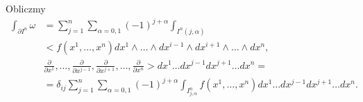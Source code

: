 \documentclass[../main.tex]{subfiles}
\begin{document}
    Obliczmy
    \begin{align*}
        \int_{\partial I^n}\omega &= \sum_{j=1}^n\sum_{\alpha = 0,1}(-1)^{j+\alpha} \int_{I^n(j,\alpha)} \\
        &\Bigg<f(x^1,\ldots,x^n)dx^1\land\ldots\land dx^{i-1}\land dx^{i+1}\land \ldots\land dx^n,\\
        &\frac{\partial }{\partial x^1} ,\ldots, \frac{\partial }{\partial x^{j-1}}, \frac{\partial }{\partial x^{j+1}}, \ldots, \frac{\partial }{\partial x^n}\Bigg>
        dx^1\ldots dx^{j-1}dx^{j+1}\ldots dx^n = \\
        &= \delta_{ij}\sum_{j=1}^n \sum_{\alpha = 0,1}(-1)^{j+\alpha}\int_{I^n_{j,\alpha}}f(x^1,\ldots,x^n)dx^1\ldots dx^{j-1}dx^{j+1}\ldots dx^n
    .\end{align*}
\end{document}
